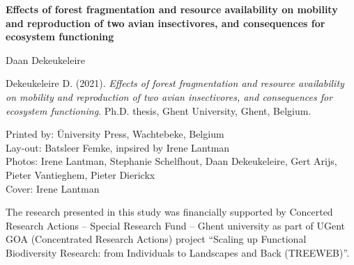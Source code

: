 \documentclass[10pt, twoside]{book} %
\begin{document}

	
\clearpage
	
	\frontmatter
	\pagestyle{frontmatter}
	\lstset{language=Perl}
	\begin{titlepage}
		
		\begin{center}	
			
			\thispagestyle{empty}
			
			\vspace*{3.00cm}
			
			{\huge \textbf{Effects of forest fragmentation and resource availability on mobility and reproduction of two avian insectivores, and consequences for ecosystem functioning}}\\
			
			\vspace{7.0 cm}
			
		\end{center}
		

		
	\end{titlepage}

\newpage
		
	\color{black}
	\newpage 
	\thispagestyle{empty}

	\vspace*{\fill}

	\begin{small}

	\noindent {} Daan Dekeukeleire

	\vspace{0.5cm}	

	\noindent Dekeukeleire D. (2021). \textit{Effects of forest fragmentation and resource availability on mobility and reproduction of two avian insectivores, and consequences for ecosystem functioning}. Ph.D. thesis, Ghent University, Ghent, Belgium.

	\vspace{0.5cm}	
\begin{tabbing}
 Printed by: \= University Press, Wachtebeke, Belgium  \\
Lay-out: \> Batsleer Femke, inpsired by Irene Lantman \\
Photos: \> Irene Lantman, Stephanie Schelfhout, Daan Dekeukeleire, Gert Arijs,\\
\> Pieter Vantieghem, Pieter Dierickx\\
Cover: \> Irene Lantman\\
\end{tabbing}

	\vspace*{0.5cm}
	
	\noindent The research presented in this study was financially supported by Concerted Research Actions -- Special Research Fund -- Ghent university as part of UGent GOA (Concentrated Research Actions) project ``Scaling up Functional Biodiversity Research: from Individuals to Landscapes and Back (TREEWEB)''.
	
	\vspace{1cm}
\end{small}	
\end{document}
